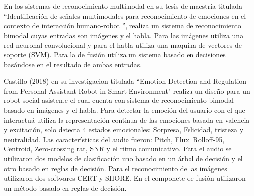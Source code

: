 \documentclass[12pt,oneside]{book}
\begin{document}
En los sistemas de reconocimiento multimodal \citep{Perez} en su tesis de maestria titulada ``Identificación de señales multimodales
para reconocimiento de emociones en el
contexto de interacción humano-robot '', realiza un sistema de reconocimiento bimodal cuyas entradas son imágenes y el habla. Para las imágenes utiliza una red neuronal convolucional y para el habla utiliza una maquina de vectores de soporte (SVM). Para la de fusión utiliza un sistema basado en decisiones basándose en el resultado de ambas entradas.


Castillo (2018) \citep{Castillo} en su investigacion titulada ``Emotion Detection and Regulation from Personal Assistant Robot in Smart Environment" realiza un diseño para un robot social asistente el cual cuenta con sistema de reconocimiento bimodal basado en imágenes y el habla. Para detectar la emoción del usuario con el que interactuá utiliza la representación continua de las emociones basada en valencia y excitación, solo detecta 4 estados emocionales: Sorpresa, Felicidad, tristeza y neutralidad. Las características del audio fueron: Pitch, Flux, Rolloff-95, Centroid, Zero-crossing rat, SNR y el ritmo comunicativo. Para el audio se utilizaron dos modelos de clasificación uno basado en un árbol de decisión y el otro basado en reglas de decisión. Para el reconocimiento de las imágenes utilizaron dos softwares CERT y SHORE. En el componete de fusión utilizaron un método basado en reglas de decisión.
\end{document}
